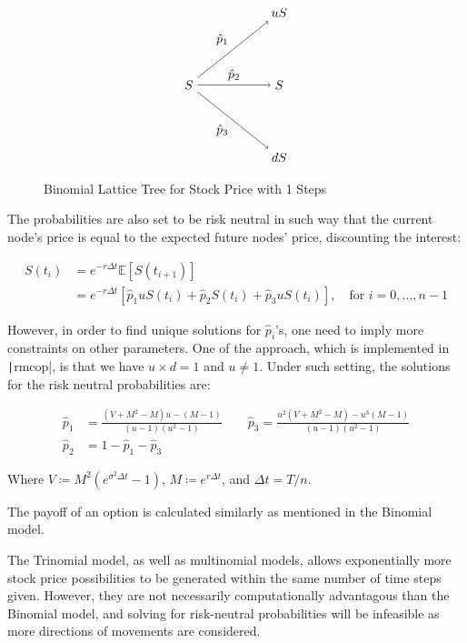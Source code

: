 
\begin{figure}[H]
    \centering
    \[\tikz{
        \node (a) at (0, 2) {$S$};
        \node (b) at (2.5, 4) {$uS$};
        \node (c) at (2.5, 2) {$S$};
		\node (d) at (2.5, 0) {$dS$};
        \path[->] (a) edge node [above left] {$\hat{p}_1$} (b)
				  (a) edge node [above] {$\hat{p}_2$} (c)
				  (a) edge node [below left] {$\hat{p}_3$} (d);
    }\]
    \caption{Binomial Lattice Tree for Stock Price with 1 Steps} \label{gph:trinomial_tree}
\end{figure}

The probabilities are also set to be risk neutral in such way that the current node's price is equal to the expected future nodes' price, discounting the interest:

\begin{align}
	S(t_{i}) &= e^{-r\Delta t}\mathbb{E}[S(t_{i+1})] \\
	&= e^{-r\Delta t}[\hat{p}_1uS(t_i)+\hat{p}_2S(t_i)+\hat{p}_3uS(t_i)],\quad\text{for }i=0,...,n-1
\end{align}

However, in order to find unique solutions for $\hat{p}_i$'s, one need to imply more constraints on other parameters. One of the approach, which is implemented in \texttt|rmcop|, is that we have $u\times d=1$ and $u\neq1$. Under such setting, the solutions for the risk neutral probabilities are:


\begin{align}
\hat{p}_1&=\frac{(V + M^2 - M) u - (M - 1)}{(u - 1)(u^2 - 1)}\qquad\hat{p}_3=\frac{u^2(V + M^2 - M) - u^3(M - 1)}{(u - 1)(u^2 - 1)} \\
\hat{p}_2&=1-\hat{p}_1-\hat{p}_3
\end{align}

Where $V\coloneqq M^2(e^{\sigma^2\Delta t} - 1)$, $M\coloneqq e^{r\Delta t}$, and $\Delta t=T/n$.

The payoff of an option is calculated similarly as mentioned in the Binomial model.

The Trinomial model, as well as multinomial models, allows exponentially more stock price possibilities to be generated within the same number of time steps given. However, they are not necessarily computationally advantagous than the Binomial model, and solving for risk-neutral probabilities will be infeasible as more directions of movements are considered.

